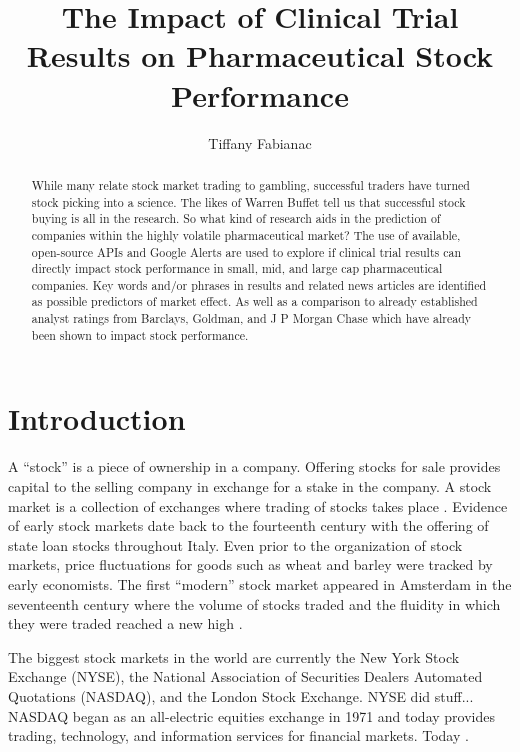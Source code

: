 \documentclass[sigconf]{acmart}
\begin{document}
\title{The Impact of Clinical Trial Results on Pharmaceutical Stock Performance}

\author{Tiffany Fabianac} 
 \renewcommand{\shortauthors}{T. Fabianac} 

\begin{abstract}
While many relate stock market trading to gambling, successful traders have turned stock picking into a science. The likes of Warren Buffet tell us that successful stock buying is all in the research. So what kind of research aids in the prediction of companies within the highly volatile pharmaceutical market? The use of available, open-source APIs and Google Alerts are used to explore if clinical trial results can directly impact stock performance in small, mid, and large cap pharmaceutical companies. Key words and/or phrases in results and related news articles are identified as possible predictors of market effect. As well as a comparison to already established analyst ratings from Barclays, Goldman, and J P Morgan Chase which have already been shown to impact stock performance.
\end{abstract}

\maketitle
\section{Introduction}
A ``stock'' is a piece of ownership in a company. Offering stocks for sale provides capital to the selling company in exchange for a stake in the company. A stock market is a collection of exchanges where trading of stocks takes place \cite{www-investopedia}. Evidence of early stock markets date back to the fourteenth century with the offering of state loan stocks throughout Italy. Even prior to the organization of stock markets, price fluctuations for goods such as wheat and barley were tracked by early economists. The first ``modern'' stock market appeared in Amsterdam in the seventeenth century where the volume of stocks traded and the fluidity in which they were traded reached a new high \cite{Braudel}. 

The biggest stock markets in the world are currently the New York Stock Exchange (NYSE), the National Association of Securities Dealers Automated Quotations (NASDAQ), and the London Stock Exchange. NYSE did stuff... NASDAQ began as an all-electric equities exchange in 1971 and today provides trading, technology, and information services for financial markets. Today   \cite{www-nasdaq}.
\end{document}
